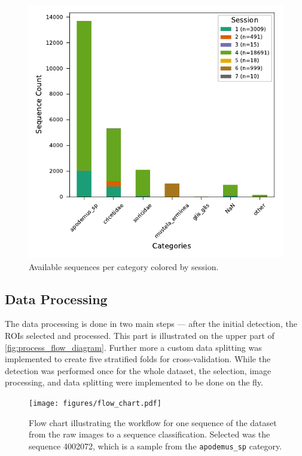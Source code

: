     \begin{figure}[H]
    \centering
    \includegraphics{figures/label2_session.pdf}
    \caption{Available sequences per category colored by session.}
    \label{fig:sequenceperlabel}
    \end{figure}

    \subsection{Data Processing}

    The data processing is done in two main steps --- after the initial detection, the \acsp{ROI} selected and processed.
    This part is illustrated on the upper part of \autoref{fig:process_flow_diagram}.
    Further more a custom data splitting was implemented to create five stratified folds for cross-validation.
    While the detection was performed once for the whole dataset, the selection, image processing, and data splitting were implemented to be done on the fly.

    \begin{figure}[p]
    \centering
    \texttt{[image: figures/flow\_chart.pdf]}
    \caption{
        Flow chart illustrating the workflow for one sequence of the dataset from the raw images to a sequence classification. 
        Selected was the sequence 4002072, which is a sample from the \texttt{apodemus\_sp} category.
        }
    \label{fig:process_flow_diagram}
    \end{figure}

